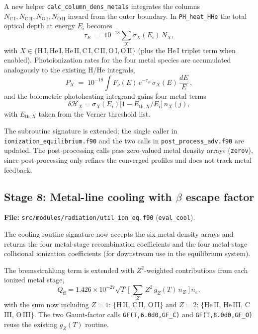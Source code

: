 \documentclass[english,a4paper]{my_memo}
\begin{document}
A new helper \texttt{calc\_column\_dens\_metals} integrates the
columns \(N_{\mathrm{C\,I}}, N_{\mathrm{C\,II}}, N_{\mathrm{O\,I}},
N_{\mathrm{O\,II}}\) inward from the outer boundary.  In
\texttt{PH\_heat\_HHe} the total optical depth at energy \(E_i\)
becomes
\[
  \tau_E \;=\; 10^{-18}
  \sum_X \sigma_X(E_i)\, N_X,
\]
with \(X \in \{\mathrm{H\,I}, \mathrm{He\,I}, \mathrm{He\,II},
\mathrm{C\,I}, \mathrm{C\,II}, \mathrm{O\,I}, \mathrm{O\,II}\}\)
(plus the He\,I triplet term when enabled).  Photoionization rates
for the four metal species are accumulated analogously to the existing
H/He integrals,
\[
  P_X \;=\;
  10^{-18} \int F_\nu(E)\,e^{-\tau_E}\,
  \sigma_X(E)\, \frac{dE}{E}\,,
\]
and the bolometric photoheating integrand gains four metal terms
\[
  \delta\mathcal{H}_X = \sigma_X(E_i)\bigl[1 - E_{\mathrm{th},X}/E_i\bigr]\,
                       n_X(j),
\]
with \(E_{\mathrm{th},X}\) taken from the Verner threshold list.

The subroutine signature is extended; the single caller in
\texttt{ionization\_equilibrium.f90} and the two calls in
\texttt{post\_process\_adv.f90} are updated.  The post-processing
calls pass zero-valued metal density arrays
(\texttt{zerov}), since post-processing only refines the converged
profiles and does not track metal feedback.

\subsection{Stage 8: Metal-line cooling with $\beta$ escape factor}
\textbf{File:} \texttt{src/modules/radiation/util\_ion\_eq.f90}
(\texttt{eval\_cool}).

The cooling routine signature now accepts the six metal density arrays
and returns the four metal-stage recombination coefficients and the
four metal-stage collisional ionization coefficients (for downstream
use in the equilibrium system).

The bremsstrahlung term is extended with \(Z^{2}\)-weighted
contributions from each ionized metal stage,
\begin{equation}
\dot{Q}_{\mathrm{ff}} = 1.426\times10^{-27}\sqrt{T}\,
\Biggl[\;
\sum_{Z}\,Z^{2}\,g_{Z}(T)\,n_{Z}\;
\Biggr]\,n_{e},
\end{equation}
with the sum now including
\(Z=1\): \{H\,II, C\,II, O\,II\} and
\(Z=2\): \{He\,II, He\,III, C\,III, O\,III\}.
The two Gaunt-factor calls
\texttt{GF(T,6.0d0,GF\_C)} and
\texttt{GF(T,8.0d0,GF\_O)} reuse the existing
\(g_{Z}(T)\) routine.
\end{document}
